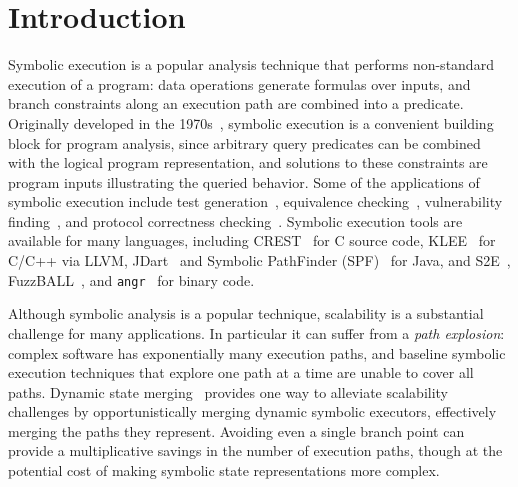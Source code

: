 \section{Introduction}
%
Symbolic execution is a popular analysis technique that performs non-standard execution of a program: data operations generate formulas over inputs, and  branch constraints along an execution path are combined into a predicate.
%
Originally developed in the 1970s~\cite{King1976,Clarke1976}, symbolic execution is a convenient building block for
program analysis, since arbitrary query predicates can be combined with the logical program representation, and
solutions to these constraints are program inputs illustrating the queried behavior.
%
Some of the applications of symbolic execution include
test generation~\cite{dart,cute}, equivalence checking~\cite{ramos,adaptorsynth}, vulnerability finding~\cite{driller,angr}, and protocol correctness checking~\cite{transport}.
%
Symbolic execution tools are available for many languages, including
CREST~\cite{BurnimS2008} for C source code, KLEE~\cite{CadarDE2008}
for C/C++ via LLVM, JDart~\cite{jdart2016} and Symbolic
PathFinder (SPF)~\cite{spf} for Java, and S2E~\cite{ChipounovKC2012},
FuzzBALL~\cite{BabicMMS2011}, and {\tt angr}~\cite{angr} for binary code.
%
%


Although symbolic analysis is a popular technique, scalability is a substantial challenge for many applications.
%
In particular it can suffer from a {\em path explosion}: complex
software has exponentially many execution paths, and baseline symbolic
execution techniques that explore one path at a time are unable to
cover all paths.
%
Dynamic state merging~\cite{HansenSS2009,kuznetsov} provides one way to
alleviate scalability challenges by opportunistically merging dynamic
symbolic executors, effectively merging the paths they represent.
%
Avoiding even a single branch point can provide a multiplicative
savings in the number of execution paths, though at the potential cost
of making symbolic state representations more complex.

